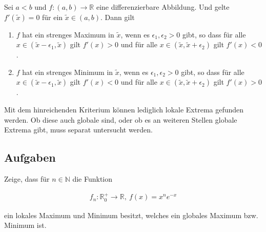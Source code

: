 \documentclass[fontsize=9pt,
               parskip=half-,
               DIV=14,
               listof=chapterentry,
               tocflat]{scrbook}
\begin{document}
\begin{theorem*}
Sei $a<b$ und $f:(a,b)\to \mathbb {R} $ eine differenzierbare Abbildung. Und gelte $f'({\tilde {x}})=0$ für ein ${\tilde {x}}\in (a,b)$. Dann gilt

\begin{enumerate}
\item $f$ hat ein strenges Maximum in ${\tilde {x}}$, wenn es $\epsilon _{1},\epsilon _{2}>0$ gibt, so dass für alle $x\in ({\tilde {x}}-\epsilon _{1},{\tilde {x}})$ gilt $f'(x)>0$ und für alle $x\in ({\tilde {x}},{\tilde {x}}+\epsilon _{2})$ gilt $f'(x)<0$.
\item $f$ hat ein strenges Minimum in ${\tilde {x}}$, wenn es $\epsilon _{1},\epsilon _{2}>0$ gibt, so dass für alle $x\in ({\tilde {x}}-\epsilon _{1},{\tilde {x}})$ gilt $f'(x)<0$ und für alle $x\in ({\tilde {x}},{\tilde {x}}+\epsilon _{2})$ gilt $f'(x)>0$.
\end{enumerate}

\end{theorem*}

\begin{warning*}
Mit dem hinreichenden Kriterium können lediglich lokale Extrema gefunden werden. Ob diese auch globale sind, oder ob es an weiteren Stellen globale Extrema gibt, muss separat untersucht werden.

\end{warning*}

\subsection{Aufgaben}

\begin{exercise*}
Zeige, dass für $n\in \mathbb {N} $ die Funktion

\begin{align*}
f_{n}:\mathbb {R} _{0}^{+}\to \mathbb {R} ,\ f(x)=x^{n}e^{-x}
\end{align*}

ein lokales Maximum und Minimum besitzt, welches ein globales Maximum bzw. Minimum ist.

\end{exercise*}
\end{document}
